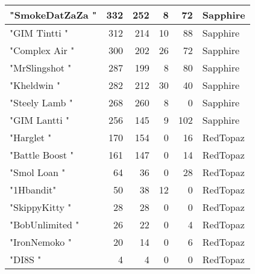 \documentclass{article}
\begin{document}
\begin{table}[htbp]
\begin{tabular}{|l|r|r|r|r|l|}
"SmokeDatZaZa " & 332 & 252 & 8 & 72 & Sapphire \\ \hline
"GIM Tintti " & 312 & 214 & 10 & 88 & Sapphire \\ \hline
"Complex Air " & 300 & 202 & 26 & 72 & Sapphire \\ \hline
"MrSlingshot " & 287 & 199 & 8 & 80 & Sapphire \\ \hline
"Kheldwin " & 282 & 212 & 30 & 40 & Sapphire \\ \hline
"Steely Lamb " & 268 & 260 & 8 & 0 & Sapphire \\ \hline
"GIM Lantti " & 256 & 145 & 9 & 102 & Sapphire \\ \hline
"Harglet " & 170 & 154 & 0 & 16 & RedTopaz \\ \hline
"Battle Boost " & 161 & 147 & 0 & 14 & RedTopaz \\ \hline
"Smol Loan " & 64 & 36 & 0 & 28 & RedTopaz \\ \hline
"1Hbandit" & 50 & 38 & 12 & 0 & RedTopaz \\ \hline
"SkippyKitty " & 28 & 28 & 0 & 0 & RedTopaz \\ \hline
"BobUnlimited " & 26 & 22 & 0 & 4 & RedTopaz \\ \hline
"IronNemoko " & 20 & 14 & 0 & 6 & RedTopaz \\ \hline
"DI8S " & 4 & 4 & 0 & 0 & RedTopaz \\ \hline
\end{tabular}
\end{table}
\end{document}
